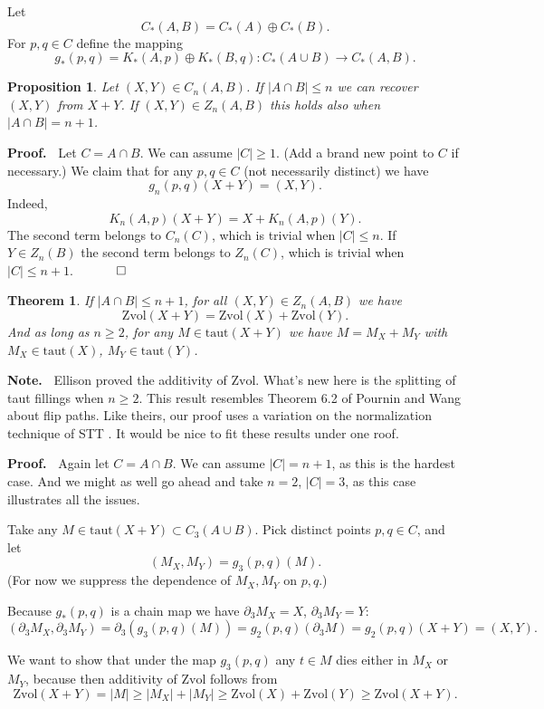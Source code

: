 \documentclass[12pt]{article}
\newtheorem{theorem}{Theorem}
\newtheorem{prop}{Proposition}
\newcommand{\proofstart}{{\noindent \bf Proof.\ }}
\newcommand{\note}{{\noindent \bf Note.\ }}
\newcommand{\proofend}{$\quad \qed$}
\def\del{\partial}
\newcommand{\union}{\cup}
\newcommand{\kw}{\mathrm}
\newcommand{\taut}{\kw{taut}}
\newcommand{\Zvol}{\kw{Zvol}}
\newcommand{\direct}{\oplus}
\begin{document}
Let
\[
C_*(A,B) = C_*(A) \direct C_*(B)
.
\]
For $p,q \in C$ define the mapping
\[
g_*(p,q) = K_*(A,p) \direct K_*(B,q):
C_*(A \cup B) \to C_*(A,B)
.
\]

\begin{prop} \label{recover}
Let $(X,Y) \in C_n(A,B)$.
If $|A \cap B| \leq n$
we can recover $(X,Y)$ from $X+Y$.
If $(X,Y) \in Z_n(A,B)$ this holds also when $|A \cap B|  = n+1$.
\end{prop}

\proofstart
Let $C=A \cap B$.
We can assume $|C| \geq 1$.
(Add a brand new point to $C$ if necessary.)
We claim that
for any $p,q \in C$
(not necessarily distinct) we have
\[
g_n(p,q)(X+Y)=(X,Y)
.
\]
Indeed,
\[
K_n(A,p)(X+Y) = X + K_n(A,p)(Y)
.
\]
The second term belongs to $C_n(C)$,
which is trivial when $|C| \leq n$.
If $Y \in Z_n(B)$ the second term belongs to $Z_n(C)$,
which is trivial when $|C| \leq n+1$.
\proofend


\begin{theorem} \label{th1}
If $|A \cap B| \leq n+1$,
for all $(X,Y) \in Z_n(A,B)$ we have
\[
\Zvol(X+Y) = \Zvol(X)+\Zvol(Y)
.
\]
And as long as $n \geq 2$,
for any $M \in \taut(X+Y)$ 
we have $M = M_X + M_Y$
with $M_X \in \taut(X)$, $M_Y \in \taut(Y)$.
\end{theorem}

\note
Ellison \cite{ellison:gap}
proved the additivity of $\Zvol$.
What's new here is the splitting of taut fillings when $n\geq 2$.
This result resembles Theorem 6.2 of
Pournin and Wang
\cite{pw:flip}
about flip paths.
Like theirs, our proof uses a variation on the normalization technique
of STT
\cite[Lemma 7]{stt:jams}.
It would be nice to fit these results under one roof.
\medskip

\proofstart
Again let $C = A \cap B$.
We can assume $|C| = n+1$,
as this is the hardest case.
And we might as well go ahead and take $n=2$, $|C|=3$,
as this case illustrates all the issues.

Take any $M \in \taut(X+Y) \subset C_3(A \union B)$.
Pick distinct points $p,q \in C$,
and let
\[
(M_X,M_Y) = g_{3}(p,q)(M)
.
\]
(For now we suppress the dependence of $M_X,M_Y$ on $p,q$.)

Because $g_*(p,q)$ is a chain map we have
$\del_{3} M_X = X$, $\del_{3} M_Y = Y$:
\[
(\del_{3} M_X, \del_{3} M_Y)
=
\del_{3} (g_{3}(p,q)(M))
=
g_2(p, q)(\del_{3} M)
=
g_2(p,q)(X+Y)
=
(X,Y)
.
\]

We want to show that under the map $g_3(p,q)$ any $t \in M$
dies either in $M_X$ or $M_Y$,
because then additivity of $\Zvol$ follows from
\[
\Zvol(X+Y) = |M|
\geq |M_X| + |M_Y|
\geq \Zvol(X) + \Zvol(Y)
\geq \Zvol(X+Y)
.
\]
\end{document}
